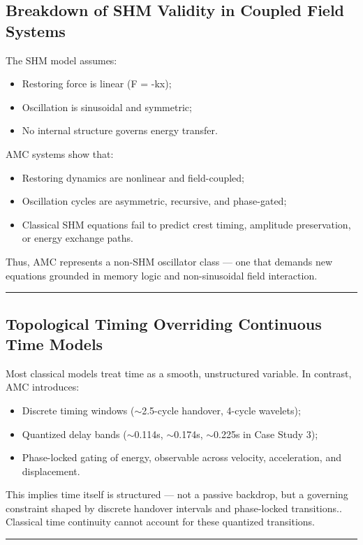 \documentclass[10pt,aps,pre,onecolumn,superscriptaddress,notitlepage]{revtex4-2}
\begin{document}
\subsection{Breakdown of SHM Validity in Coupled Field Systems}
The SHM model assumes:
\begin{itemize}
    \item Restoring force is linear (F = -kx);
    \item Oscillation is sinusoidal and symmetric;
    \item No internal structure governs energy transfer.
\end{itemize}

AMC systems show that:

\begin{itemize}
    \item Restoring dynamics are nonlinear and field-coupled;
    \item Oscillation cycles are asymmetric, recursive, and phase-gated;
    \item Classical SHM equations fail to predict crest timing, amplitude preservation, or energy exchange paths.
\end{itemize}
Thus, AMC represents a non-SHM oscillator class — one that demands new equations grounded in memory logic and non-sinusoidal field interaction. 
\vspace{1em}
\hrule
\vspace{1em}

\subsection{Topological Timing Overriding Continuous Time Models}
Most classical models treat time as a smooth, unstructured variable. In contrast, AMC introduces:
\begin{itemize}
    \item Discrete timing windows ($\sim$2.5-cycle handover, 4-cycle wavelets);
    \item Quantized delay bands ($\sim$0.114s, $\sim$0.174s, $\sim$0.225s in Case Study 3);
    \item Phase-locked gating of energy, observable across velocity, acceleration, and displacement.
\end{itemize}

This implies time itself is structured — not a passive backdrop, but a governing constraint shaped by discrete handover intervals and phase-locked transitions.. Classical time continuity cannot account for these quantized transitions. 
\vspace{1em}
\hrule
\vspace{1em}
\end{document}

